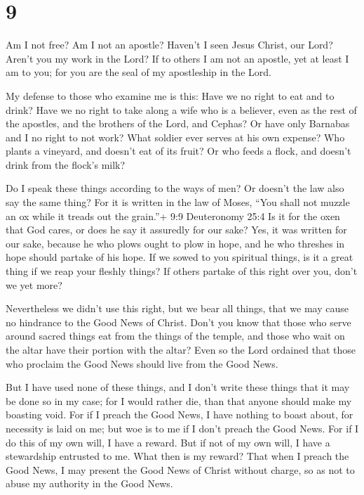 \hypertarget{section-8}{%
\section{9}\label{section-8}}

 Am I not free? Am I not an apostle? Haven't I seen Jesus
Christ, our Lord? Aren't you my work in the Lord?  If to
others I am not an apostle, yet at least I am to you; for you are the
seal of my apostleship in the Lord.

 My defense to those who examine me is this: 
Have we no right to eat and to drink?  Have we no right to
take along a wife who is a believer, even as the rest of the apostles,
and the brothers of the Lord, and Cephas?  Or have only
Barnabas and I no right to not work?  What soldier ever
serves at his own expense? Who plants a vineyard, and doesn't eat of its
fruit? Or who feeds a flock, and doesn't drink from the flock's milk?

 Do I speak these things according to the ways of men? Or
doesn't the law also say the same thing?  For it is written
in the law of Moses, ``You shall not muzzle an ox while it treads out
the grain.''+ 9:9 Deuteronomy 25:4 Is it for the oxen that God cares,
 or does he say it assuredly for our sake? Yes, it was
written for our sake, because he who plows ought to plow in hope, and he
who threshes in hope should partake of his hope.  If we
sowed to you spiritual things, is it a great thing if we reap your
fleshly things?  If others partake of this right over you,
don't we yet more?

Nevertheless we didn't use this right, but we bear all things, that we
may cause no hindrance to the Good News of Christ.  Don't
you know that those who serve around sacred things eat from the things
of the temple, and those who wait on the altar have their portion with
the altar?  Even so the Lord ordained that those who
proclaim the Good News should live from the Good News.

 But I have used none of these things, and I don't write
these things that it may be done so in my case; for I would rather die,
than that anyone should make my boasting void.  For if I
preach the Good News, I have nothing to boast about, for necessity is
laid on me; but woe is to me if I don't preach the Good News.
 For if I do this of my own will, I have a reward. But if
not of my own will, I have a stewardship entrusted to me. 
What then is my reward? That when I preach the Good News, I may present
the Good News of Christ without charge, so as not to abuse my authority
in the Good News.


